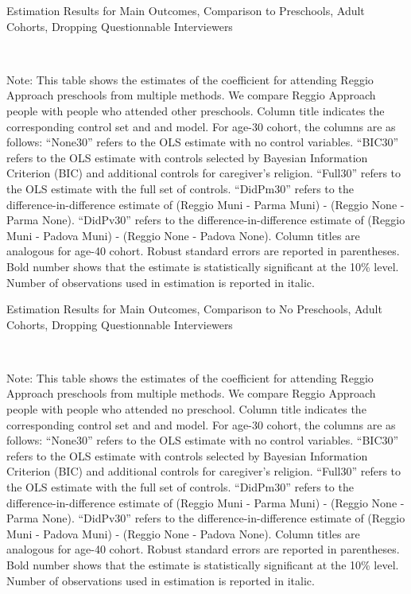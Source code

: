 \begin{table}[H] \caption{Estimation Results for Main Outcomes, Comparison to Preschools, Adult Cohorts, Dropping Questionnable Interviewers} \label{ols-M-adult-reg-pres-dropint}
\scalebox{0.75}{}
\vspace{1ex} \\
\footnotesize\raggedright{Note: This table shows the estimates of the coefficient for attending Reggio Approach preschools from multiple methods. We compare Reggio Approach people with people who attended other preschools.  Column title indicates the corresponding control set and and model. For age-30 cohort, the columns are as follows: ``None30'' refers to the OLS estimate with no control variables. ``BIC30'' refers to the OLS estimate with controls selected by Bayesian Information Criterion (BIC) and additional controls for caregiver's religion. ``Full30'' refers to the OLS estimate with the full set of controls. ``DidPm30'' refers to the difference-in-difference estimate of (Reggio Muni - Parma Muni) - (Reggio None - Parma None). ``DidPv30'' refers to the difference-in-difference estimate of (Reggio Muni - Padova Muni) - (Reggio None - Padova None).  Column titles are analogous for age-40 cohort. Robust standard errors are reported in parentheses. Bold number shows that the estimate is statistically significant at the 10\% level. Number of observations used in estimation is reported in italic.}
\end{table}

\begin{table}[H] \caption{Estimation Results for Main Outcomes, Comparison to No Preschools, Adult Cohorts, Dropping Questionnable Interviewers} \label{ols-M-adult-reg-nopres-dropint}
\scalebox{0.75}{}
\vspace{1ex} \\
\footnotesize\raggedright{Note: This table shows the estimates of the coefficient for attending Reggio Approach preschools from multiple methods. We compare Reggio Approach people with people who attended no preschool. Column title indicates the corresponding control set and and model. For age-30 cohort, the columns are as follows: ``None30'' refers to the OLS estimate with no control variables. ``BIC30'' refers to the OLS estimate with controls selected by Bayesian Information Criterion (BIC) and additional controls for caregiver's religion. ``Full30'' refers to the OLS estimate with the full set of controls. ``DidPm30'' refers to the difference-in-difference estimate of (Reggio Muni - Parma Muni) - (Reggio None - Parma None). ``DidPv30'' refers to the difference-in-difference estimate of (Reggio Muni - Padova Muni) - (Reggio None - Padova None).   Column titles are analogous for age-40 cohort. Robust standard errors are reported in parentheses. Bold number shows that the estimate is statistically significant at the 10\% level. Number of observations used in estimation is reported in italic.}
\end{table}




